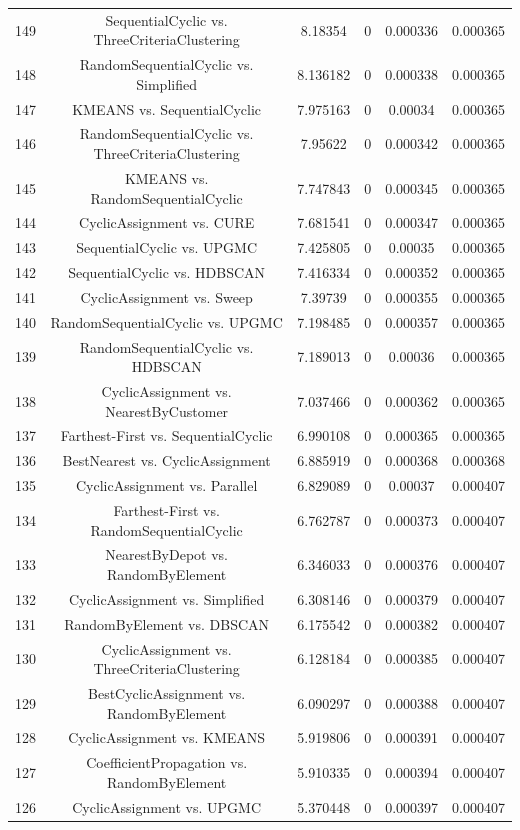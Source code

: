 \documentclass[a4paper,10pt]{article}
\begin{document}
\begin{landscape}
\begin{table}[!htp]
\begin{tabular}{cccccc}
149&SequentialCyclic vs. ThreeCriteriaClustering&8.18354&0&0.000336&0.000365\\
148&RandomSequentialCyclic vs. Simplified&8.136182&0&0.000338&0.000365\\
147&KMEANS vs. SequentialCyclic&7.975163&0&0.00034&0.000365\\
146&RandomSequentialCyclic vs. ThreeCriteriaClustering&7.95622&0&0.000342&0.000365\\
145&KMEANS vs. RandomSequentialCyclic&7.747843&0&0.000345&0.000365\\
144&CyclicAssignment vs. CURE&7.681541&0&0.000347&0.000365\\
143&SequentialCyclic vs. UPGMC&7.425805&0&0.00035&0.000365\\
142&SequentialCyclic vs. HDBSCAN&7.416334&0&0.000352&0.000365\\
141&CyclicAssignment vs. Sweep&7.39739&0&0.000355&0.000365\\
140&RandomSequentialCyclic vs. UPGMC&7.198485&0&0.000357&0.000365\\
139&RandomSequentialCyclic vs. HDBSCAN&7.189013&0&0.00036&0.000365\\
138&CyclicAssignment vs. NearestByCustomer&7.037466&0&0.000362&0.000365\\
137&Farthest-First vs. SequentialCyclic&6.990108&0&0.000365&0.000365\\
136&BestNearest vs. CyclicAssignment&6.885919&0&0.000368&0.000368\\
135&CyclicAssignment vs. Parallel&6.829089&0&0.00037&0.000407\\
134&Farthest-First vs. RandomSequentialCyclic&6.762787&0&0.000373&0.000407\\
133&NearestByDepot vs. RandomByElement&6.346033&0&0.000376&0.000407\\
132&CyclicAssignment vs. Simplified&6.308146&0&0.000379&0.000407\\
131&RandomByElement vs. DBSCAN&6.175542&0&0.000382&0.000407\\
130&CyclicAssignment vs. ThreeCriteriaClustering&6.128184&0&0.000385&0.000407\\
129&BestCyclicAssignment vs. RandomByElement&6.090297&0&0.000388&0.000407\\
128&CyclicAssignment vs. KMEANS&5.919806&0&0.000391&0.000407\\
127&CoefficientPropagation vs. RandomByElement&5.910335&0&0.000394&0.000407\\
126&CyclicAssignment vs. UPGMC&5.370448&0&0.000397&0.000407\\

\end{tabular}
\end{table}
\end{landscape}
\end{document}
